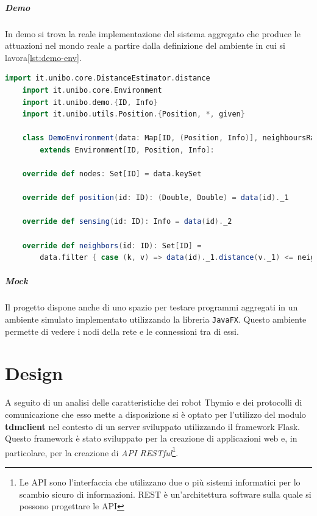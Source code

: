 \documentclass[12pt,a4paper,openright,twoside]{book}
\begin{document}
\paragraph{Demo}
In demo si trova la reale implementazione del sistema aggregato che produce le attuazioni nel mondo reale a partire dalla definizione del ambiente in cui si lavora\cref{lst:demo-env}.

\begin{lstlisting}[language=Scala, label={lst:demo-env}, caption={Definizione dell'ambiente}]
    import it.unibo.core.DistanceEstimator.distance
    import it.unibo.core.Environment
    import it.unibo.demo.{ID, Info}
    import it.unibo.utils.Position.{Position, *, given}

    class DemoEnvironment(data: Map[ID, (Position, Info)], neighboursRadius: Double)
        extends Environment[ID, Position, Info]:

    override def nodes: Set[ID] = data.keySet

    override def position(id: ID): (Double, Double) = data(id)._1

    override def sensing(id: ID): Info = data(id)._2

    override def neighbors(id: ID): Set[ID] =
        data.filter { case (k, v) => data(id)._1.distance(v._1) <= neighboursRadius }.keys.toSet
\end{lstlisting}

\paragraph{Mock}
Il progetto dispone anche di uno spazio per testare programmi aggregati in un ambiente simulato implementato utilizzando la libreria \verb|JavaFX|. Questo ambiente permette di vedere i nodi della rete e le connessioni tra di essi.

\chapter{Design}
\label{chap:design}

A seguito di un analisi delle caratteristiche dei robot Thymio e dei protocolli di comunicazione che esso mette a disposizione si è optato per l'utilizzo del modulo \textbf{tdmclient} nel contesto di un server sviluppato utilizzando il framework Flask. Questo framework è stato sviluppato per la creazione di applicazioni web e, in particolare, per la creazione di \textit{API RESTful}\footnote{Le API sono l'interfaccia che utilizzano due o più sistemi informatici per lo scambio sicuro di informazioni. REST è un'architettura software sulla quale si possono progettare le API}. 
\end{document}
